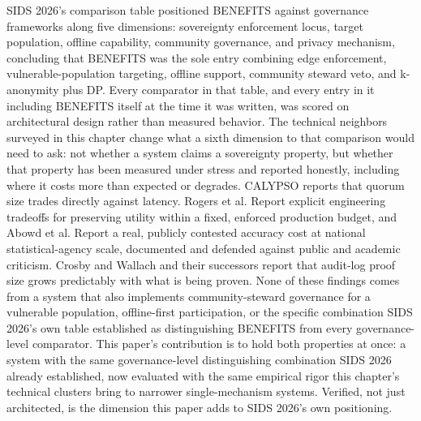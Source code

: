 SIDS 2026's comparison table \cite{katrakazas2026} positioned BENEFITS against governance frameworks along five dimensions: sovereignty enforcement locus, target population, offline capability, community governance, and privacy mechanism, concluding that BENEFITS was the sole entry combining edge enforcement, vulnerable-population targeting, offline support, community steward veto, and k-anonymity plus DP. Every comparator in that table, and every entry in it including BENEFITS itself at the time it was written, was scored on architectural design rather than measured behavior. The technical neighbors surveyed in this chapter change what a sixth dimension to that comparison would need to ask: not whether a system claims a sovereignty property, but whether that property has been measured under stress and reported honestly, including where it costs more than expected or degrades. CALYPSO reports that quorum size trades directly against latency. Rogers et al. Report explicit engineering tradeoffs for preserving utility within a fixed, enforced production budget, and Abowd et al. Report a real, publicly contested accuracy cost at national statistical-agency scale, documented and defended against public and academic criticism. Crosby and Wallach and their successors report that audit-log proof size grows predictably with what is being proven. None of these findings comes from a system that also implements community-steward governance for a vulnerable population, offline-first participation, or the specific combination SIDS 2026's own table established as distinguishing BENEFITS from every governance-level comparator. This paper's contribution is to hold both properties at once: a system with the same governance-level distinguishing combination SIDS 2026 already established, now evaluated with the same empirical rigor this chapter's technical clusters bring to narrower single-mechanism systems. Verified, not just architected, is the dimension this paper adds to SIDS 2026's own positioning.
